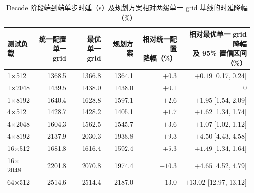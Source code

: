 \begin{table}[!htb]\centering
\caption{Decode 阶段端到端单步时延（\textmu s）及规划方案相对两级单一 grid 基线的时延降幅（\%）}\label{tab:decode}
\small
\begin{tabular}{@{}lrrrrr@{}}
\toprule
测试负载 & \makecell[r]{统一配置\\单一 grid} & \makecell[r]{最优\\单一 grid} & 规划方案 & \makecell[r]{相对统一配置\\降幅（\%）} & \makecell[r]{相对最优单一 grid 降幅\\及 95\% 置信区间（\%）}\\
\midrule
1$\times$512 & 1368.5 & 1366.8 & 1364.1 & $+0.3$ & $+0.19$ [0.17, 0.24] \\
1$\times$2048 & 1439.5 & 1438.0 & 1438.0 & $+0.1$ & 0 \\
1$\times$8192 & 1640.4 & 1628.8 & 1597.1 & $+2.6$ & $+1.95$ [1.54, 2.09] \\
4$\times$512 & 1428.7 & 1428.2 & 1405.1 & $+1.7$ & $+1.62$ [1.34, 1.74] \\
4$\times$2048 & 1604.3 & 1562.5 & 1545.7 & $+3.6$ & $+1.07$ [1.02, 1.12] \\
4$\times$8192 & 2137.9 & 2030.3 & 1938.8 & $+9.3$ & $+4.50$ [4.43, 4.58] \\
16$\times$512 & 1681.8 & 1616.4 & 1592.4 & $+5.3$ & $+1.49$ [1.34, 1.64] \\
16$\times$2048 & 2201.8 & 2070.8 & 1974.4 & $+10.3$ & $+4.65$ [4.52, 4.79] \\
64$\times$512 & 2514.6 & 2514.4 & 2187.0 & $+13.0$ & $+13.02$ [12.97, 13.12] \\
\bottomrule
\end{tabular}
\end{table}

